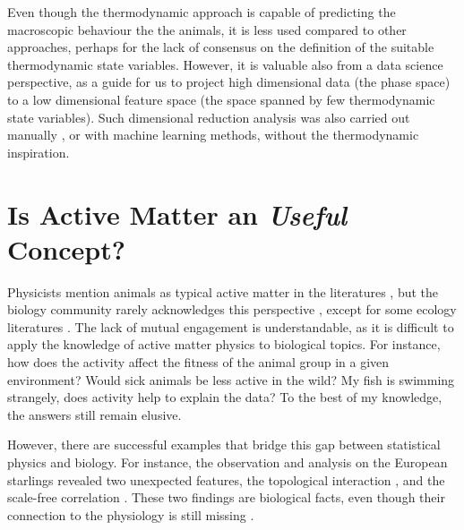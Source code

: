 \documentclass[11pt,twoside]{report}
\begin{document}
Even though the thermodynamic approach is capable of predicting the macroscopic behaviour the the animals, it is less used compared to other approaches, perhaps for the lack of consensus on the definition of the suitable thermodynamic state variables.
However, it is valuable also from a data science perspective, as a guide for us to project high dimensional data (the phase space) to a low dimensional feature space (the space spanned by few thermodynamic state variables). Such dimensional reduction analysis was also carried out manually \cite{yang2021pcb}, or with machine learning methods\cite{tang2020}, without the thermodynamic inspiration.

\section{Is Active Matter an \emph{Useful} Concept?}
\label{section:intro-benefit}

Physicists mention animals as typical active matter in the literatures \cite{reynolds1987, vicsek1995, chate2008EPJ, chen2015, kürsten2021}, but the biology community rarely acknowledges this perspective \cite{ouellette2022}, except for some ecology literatures \cite{guttal2012, tang2020}. The lack of mutual engagement is understandable, as it is difficult to apply the knowledge of active matter physics to biological topics. For instance, how does the activity affect the fitness of the animal group in a given environment? Would sick animals be less active in the wild? My fish is swimming strangely, does activity help to explain the data? To the best of my knowledge, the answers still remain elusive.

However, there are successful examples that bridge this gap between statistical physics and biology.
For instance, the observation and analysis on the European starlings revealed two unexpected features, the topological interaction \cite{ballerini2008pnas}, and the scale-free correlation \cite{cavagna2010}. These two findings are biological facts, even though their connection to the physiology is still missing \cite{ouellette2022}.

\end{document}
